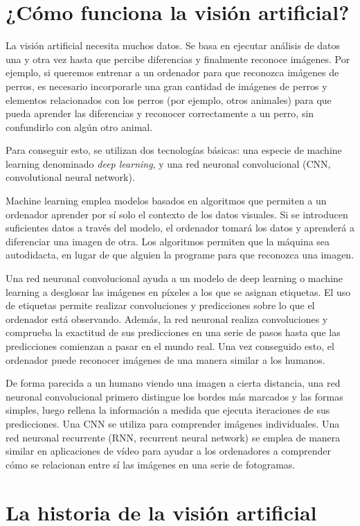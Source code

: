 \section{¿Cómo funciona la visión artificial?}
La visión artificial necesita muchos datos. Se basa en ejecutar análisis de datos una y otra vez hasta que percibe diferencias y finalmente reconoce imágenes. Por ejemplo, si queremos entrenar a un ordenador para que reconozca imágenes de perros, es necesario incorporarle una gran cantidad de imágenes de perros y elementos relacionados con los perros (por ejemplo, otros animales) para que pueda aprender las diferencias y reconocer correctamente a un perro, sin confundirlo con algún otro animal.

Para conseguir esto, se utilizan dos tecnologías básicas: una especie de machine learning denominado \textit{deep learning}, y una red neuronal convolucional (CNN, convolutional neural network).

Machine learning emplea modelos basados en algoritmos que permiten a un ordenador aprender por sí solo el contexto de los datos visuales. Si se introducen suficientes datos a través del modelo, el ordenador tomará los datos y aprenderá a diferenciar una imagen de otra. Los algoritmos permiten que la máquina sea autodidacta, en lugar de que alguien la programe para que reconozca una imagen.

Una red neuronal convolucional ayuda a un modelo de deep learning o machine learning a desglosar las imágenes en píxeles a los que se asignan etiquetas. El uso de etiquetas permite realizar convoluciones y predicciones sobre lo que el ordenador está observando. Además, la red neuronal realiza convoluciones y comprueba la exactitud de sus predicciones en una serie de pasos hasta que las predicciones comienzan a pasar en el mundo real. Una vez conseguido esto, el ordenador puede reconocer imágenes de una manera similar a los humanos.


De forma parecida a un humano viendo una imagen a cierta distancia, una red neuronal convolucional primero distingue los bordes más marcados y las formas simples, luego rellena la información a medida que ejecuta iteraciones de sus predicciones. Una CNN se utiliza para comprender imágenes individuales. Una red neuronal recurrente (RNN, recurrent neural network) se emplea de manera similar en aplicaciones de vídeo para ayudar a los ordenadores a comprender cómo se relacionan entre sí las imágenes en una serie de fotogramas.

\newpage
\section{La historia de la visión artificial}

